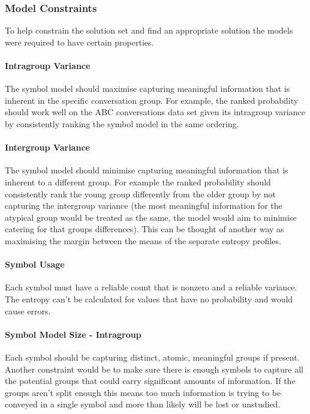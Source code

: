 \subsubsection{Model Constraints}
To help constrain the solution set and find an appropriate solution the models were required to have certain properties.
 
\paragraph{Intragroup Variance} 
The symbol model should maximise capturing meaningful information that is inherent in the specific conversation group. For example, the ranked probability should work well on the ABC conversations data set given its intragroup variance by consistently ranking the symbol model in the same ordering. 

\paragraph{Intergroup Variance}
The symbol model should minimise capturing meaningful information that is inherent to a different group. For example the ranked probability should consistently rank the young group differently from the older group by not capturing the intergroup variance (the most meaningful information for the atypical group would be treated as the same, the model would aim to minimise catering for that groups differences). This can be thought of another way as maximising the margin between the means of the separate entropy profiles. 

\paragraph{Symbol Usage}
Each symbol must have a reliable count that is nonzero and a reliable variance. The entropy can't be calculated for values that have no probability and would cause errors.

\paragraph{Symbol Model Size - Intragroup}
Each symbol should be capturing distinct, atomic, meaningful groups if present. Another constraint would be to make sure there is enough symbols to capture all the potential groups that could carry significant amounts of information. If the groups aren't split enough this means too much information is trying to be conveyed in a single symbol and more than likely will be lost or unstudied. 

